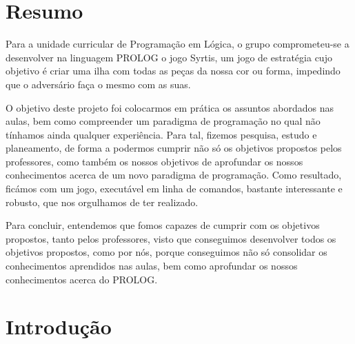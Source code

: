 \documentclass[a4paper]{article}
\begin{document}

\newpage

\section*{Resumo}

Para a unidade curricular de Programação em Lógica, o grupo comprometeu-se a desenvolver na linguagem PROLOG o jogo Syrtis, um jogo de estratégia cujo objetivo é criar uma ilha com todas as peças da nossa cor ou forma, impedindo que o adversário faça o mesmo com as suas.

O objetivo deste projeto foi colocarmos em prática os assuntos abordados nas aulas, bem como compreender um paradigma de programação no qual não tínhamos ainda qualquer experiência. Para tal, fizemos pesquisa, estudo e planeamento, de forma a podermos cumprir não só os objetivos propostos pelos professores, como também os nossos objetivos de aprofundar os nossos conhecimentos acerca de um novo paradigma de programação. Como resultado, ficámos com um jogo, executável em linha de comandos, bastante interessante e robusto, que nos orgulhamos de ter realizado.

Para concluir, entendemos que fomos capazes de cumprir com os objetivos propostos, tanto pelos professores, visto que conseguimos desenvolver todos os objetivos propostos, como por nós, porque conseguimos não só consolidar os conhecimentos aprendidos nas aulas, bem como aprofundar os nossos conhecimentos acerca do PROLOG.
\newpage

\tableofcontents



\newpage

\section{Introdução}
\end{document}
